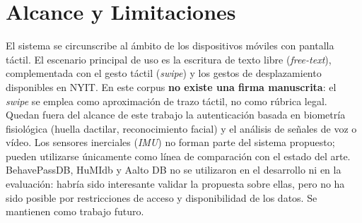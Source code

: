 \section{Alcance y Limitaciones}

El sistema se circunscribe al ámbito de los dispositivos móviles con pantalla táctil. El escenario 
principal de uso es la escritura de texto libre (\textit{free-text}), complementada con el gesto táctil 
(\textit{swipe}) y los gestos de desplazamiento disponibles en NYIT. En este corpus \textbf{no existe una firma manuscrita}:
el \textit{swipe} se emplea como aproximación de trazo táctil, no como rúbrica legal.
Quedan fuera del alcance de este trabajo la autenticación basada en biometría fisiológica 
(huella dactilar, reconocimiento facial) y el análisis de señales de voz o vídeo. 
Los sensores inerciales (\textit{IMU}) no forman parte del sistema propuesto; pueden utilizarse únicamente 
como línea de comparación con el estado del arte.
BehavePassDB, HuMIdb y Aalto DB no se utilizaron en el desarrollo ni en la evaluación: habría sido
interesante validar la propuesta sobre ellas, pero no ha sido posible por restricciones de acceso
y disponibilidad de los datos. Se mantienen como trabajo futuro.
